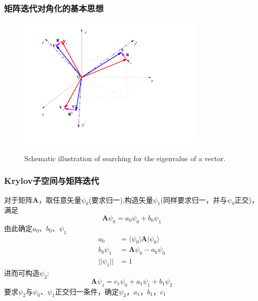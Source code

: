 \frame
{
	\frametitle{矩阵迭代对角化的基本思想}
\begin{figure}[h!]
\centering
\includegraphics[height=2.5in,width=3.5in,viewport=0 0 850 590,clip]{Figures/Coordinate_transformation.png}
\label{decent_CG}
\caption{\tiny \textrm{Schematic illustration of searching for the eigenvalue of a vector.}}%
\end{figure}
}

\frame
{
	\frametitle{\textrm{Krylov}子空间与矩阵迭代}
	对于矩阵$\mathbf{A}$，取任意矢量$\psi_0$(要求归一),构造矢量$\psi_1$(同样要求归一，并与$\psi_0$正交)，满足
	\begin{displaymath}
		\mathbf{A}\psi_0=a_0\psi_0+b_0\psi_1
	\end{displaymath}
	由此确定$a_0$、$b_0$、$\psi_1$
	\begin{displaymath}
		\begin{aligned}
			a_0&=\langle\psi_0|\mathbf{A}|\psi_0\rangle\\
			b_0\psi_1&=\mathbf{A}\psi_0-a_0\psi_0\\
			||\psi_1||&=1
		\end{aligned}
	\end{displaymath}
	进而可构造$\psi_2$:
	\begin{displaymath}
		\mathbf{A}\psi_1=c_1\psi_0+a_1\psi_1+b_1\psi_2
	\end{displaymath}
	要求$\psi_2$与$\psi_0$、$\psi_1$正交归一条件，确定$\psi_2$，$a_1$，$b_1$，$c_1$
}

